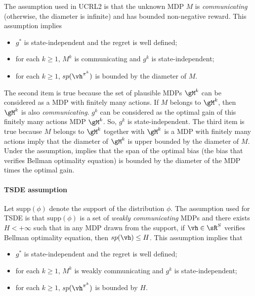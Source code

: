 The assumption used in UCRL2 is that the unknown MDP $M$ is \emph{communicating} (otherwise, the diameter is infinite) and has bounded non-negative reward.
This assumption implies
\begin{itemize}
    \item $g^*$ is state-independent and the regret is well defined;
    \item for each $k\ge1$, $M^k$ is communicating and $g^k$ is state-independent;
    \item for each $k\ge1$, $sp(\vh^{\pi^k})$ is bounded by the diameter of $M$.
\end{itemize}
The second item is true because the set of plausible MDPs $\gM^k$ can be considered as a MDP with finitely many actions.
If $M$ belongs to $\gM^k$, then $\gM^k$ is also \emph{communicating}.
$g^k$ can be considered as the optimal gain of this finitely many actions MDP $\gM^k$.
So, $g^k$ is state-independent.
The third item is true because $M$ belongs to $\gM^k$ together with $\gM^k$ is a MDP with finitely many actions imply that the diameter of $\gM^k$ is upper bounded by the diameter of $M$.
Under the assumption, \cite[Theorem~4]{bartlett2012regal} implies that the span of the optimal bias (the bias that verifies Bellman optimality equation) is bounded by the diameter of the MDP times the optimal gain.


\paragraph{TSDE assumption}

Let $\mathrm{supp}(\phi)$ denote the support of the distribution $\phi$.
The assumption used for TSDE is that $\mathrm{supp}(\phi)$ is a set of \emph{weakly communicating} MDPs and there exists $H<+\infty$ such that in any MDP drawn from the support, if $\vh\in\sR^S$ verifies Bellman optimality equation, then $sp(\vh)\le H$.
This assumption implies that
\begin{itemize}
    \item $g^*$ is state-independent and the regret is well defined;
    \item for each $k\ge1$, $M^k$ is weakly communicating and $g^k$ is state-independent;
    \item for each $k\ge1$, $sp(\vh^{\pi^k})$ is bounded by $H$.
\end{itemize}


